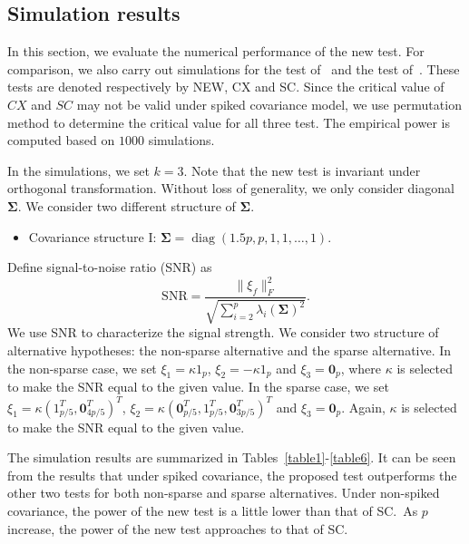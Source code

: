 \documentclass[12pt]{article} %
\DeclareMathOperator{\mytr}{tr}
\DeclareMathOperator{\mydiag}{diag}
\newcommand{\bfsym}[1]{\ensuremath{\boldsymbol{#1}}}
\def\bSigma {\bfsym {\Sigma}}
\theoremstyle{definition}
\begin{document}
   \subsection{Simulation results}
In this section, we evaluate the numerical performance of the new test.
For comparison, we also carry out simulations for the test of~\citet{Cai2014High} and the test of~\citet{Schott2007Some}.
These tests are denoted respectively by NEW, CX and SC.
Since the critical value of $CX$ and $SC$ may not be valid under spiked covariance model, we use permutation method to determine the critical value for all three test.
The empirical power is computed based on $1000$ simulations.

In the simulations, we set $k=3$.
Note that the new test is invariant under orthogonal transformation.
Without loss of generality, we only consider diagonal $\bSigma$.
We consider two different structure of $\bSigma$.
\begin{itemize}
    \item
        Covariance structure I: $\bSigma=\mydiag(1.5p,p,1,1,\ldots,1)$.
\end{itemize}

Define signal-to-noise ratio (SNR) as
$$
\textrm{SNR}=\frac{\|\xi_f\|_F^2}{\sqrt{\sum_{i=2}^{p}\lambda_i(\bSigma)^2}}.
$$
We use SNR to characterize the signal strength.
We consider two structure of alternative hypotheses: the non-sparse alternative and the sparse alternative.
In the non-sparse case, we set $\xi_1=\kappa 1_p$, $\xi_2=-\kappa 1_p$ and $\xi_3=\mathbf{0}_p$, where $\kappa$ is selected to make the SNR equal to the given value.
In the sparse case, we set $\xi_1=\kappa (1_{p/5}^T,\mathbf{0}_{4p/5}^T)^T$, $\xi_2=\kappa (\mathbf{0}_{p/5}^T, 1_{p/5}^T,\mathbf{0}_{3p/5}^T)^T$ and $\xi_3=\mathbf{0}_p$. Again, $\kappa$ is selected to make the SNR equal to the given value.

The simulation results are summarized in Tables~\ref{table1}-\ref{table6}. It can be seen from the results that under spiked covariance, the proposed test outperforms the other two tests for both non-sparse and sparse alternatives.
Under non-spiked covariance, the power of the new test is a little lower than that of SC.\ 
As $p$ increase, the power of the new test approaches to that of SC.

\end{document}
